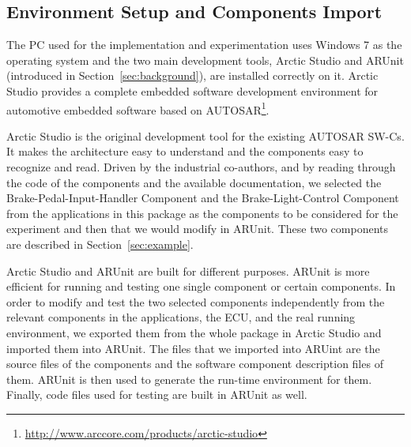 \subsection{Environment Setup and Components Import}
The PC used for the implementation and experimentation uses Windows 7 as the operating system and the two main development tools, Arctic Studio and ARUnit (introduced in Section~\ref{sec:background}), are installed correctly on it. Arctic Studio provides a complete embedded software development environment for automotive embedded software based on AUTOSAR\footnote{\url{http://www.arccore.com/products/arctic-studio}}. %

Arctic Studio is the original development tool for the existing AUTOSAR SW-Cs. %
It makes the architecture easy to understand and the components easy to recognize and read. Driven by the industrial co-authors, and by reading through the code of the components and the available documentation, we selected the Brake-Pedal-Input-Handler Component and the Brake-Light-Control Component from the applications in this package as the components to be considered for the experiment and then that we would modify in ARUnit. These two components are described in Section~\ref{sec:example}.

Arctic Studio and ARUnit are built for different purposes. ARUnit is more efficient for running and testing one single component or certain components. In order to modify and test the two selected components independently from the relevant components in the applications, the ECU, and the real running environment, we exported them from the whole package in Arctic Studio and imported them into ARUnit. The files that we imported into ARUint are the source files of the components and the software component description files of them. ARUnit is then used to generate the run-time environment for them. %
Finally, code files used for testing are built in ARUnit as well. 


